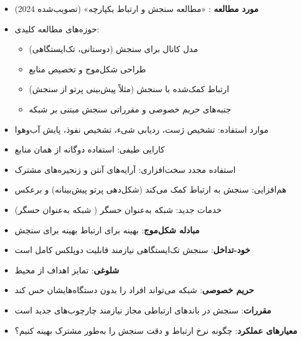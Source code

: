



\begin{itemize}
\tightlist
\item
  \textbf{مورد مطالعه }: «مطالعه سنجش و ارتباط یکپارچه» (تصویب‌شده 2024)
\item
  حوزه‌های مطالعه کلیدی:

  \begin{itemize}
  \tightlist
  \item
    مدل کانال برای سنجش (دوستانی، تک‌ایستگاهی)
  \item
    طراحی شکل‌موج و تخصیص منابع
  \item
    ارتباط کمک‌شده با سنجش (مثلاً پیش‌بینی پرتو از سنجش)
  \item
    جنبه‌های حریم خصوصی و مقرراتی سنجش مبتنی بر شبکه
  \end{itemize}
\item
  موارد استفاده: تشخیص ژست، ردیابی شیء، تشخیص نفوذ، پایش آب‌وهوا
\end{itemize}


\begin{itemize}
\tightlist
\item
  کارایی طیفی: استفاده دوگانه از همان منابع
\item
  استفاده مجدد سخت‌افزاری: آرایه‌های آنتن و زنجیره‌های  مشترک
\item
  هم‌افزایی: سنجش به ارتباط کمک می‌کند (شکل‌دهی پرتو پیش‌بینانه) و برعکس
\item
  خدمات جدید: شبکه به‌عنوان حسگر (  شبکه به‌عنوان حسگر)
\end{itemize}


\begin{itemize}
\tightlist
\item
  \textbf{مبادله شکل‌موج}: بهینه برای ارتباط \lr{\mbox{\ensuremath{\neq}}} بهینه برای سنجش
\item
  \textbf{خود-تداخل}: سنجش تک‌ایستگاهی نیازمند قابلیت دوپلکس کامل است
\item
  \textbf{شلوغی}: تمایز اهداف از محیط
\item
  \textbf{حریم خصوصی}: شبکه می‌تواند افراد را بدون دستگاه‌هایشان حس کند
\item
  \textbf{مقررات}: سنجش در باندهای ارتباطی مجاز نیازمند چارچوب‌های جدید است
\item
  \textbf{معیارهای عملکرد}: چگونه نرخ ارتباط و دقت سنجش را به‌طور مشترک بهینه کنیم؟
\end{itemize}

